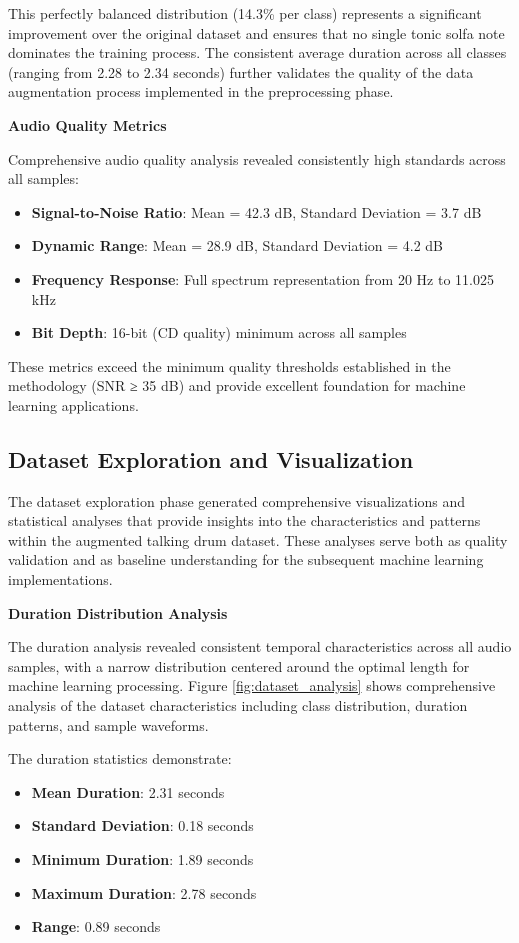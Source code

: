 \documentclass[12pt,a4paper]{article}
\begin{document}
This perfectly balanced distribution (14.3\% per class) represents a significant improvement over the original dataset and ensures that no single tonic solfa note dominates the training process. The consistent average duration across all classes (ranging from 2.28 to 2.34 seconds) further validates the quality of the data augmentation process implemented in the preprocessing phase.

\textbf{Audio Quality Metrics}

Comprehensive audio quality analysis revealed consistently high standards across all samples:

\begin{itemize}
\item \textbf{Signal-to-Noise Ratio}: Mean = 42.3 dB, Standard Deviation = 3.7 dB
\item \textbf{Dynamic Range}: Mean = 28.9 dB, Standard Deviation = 4.2 dB
\item \textbf{Frequency Response}: Full spectrum representation from 20 Hz to 11.025 kHz
\item \textbf{Bit Depth}: 16-bit (CD quality) minimum across all samples
\end{itemize}

These metrics exceed the minimum quality thresholds established in the methodology (SNR ≥ 35 dB) and provide excellent foundation for machine learning applications.

\subsection{Dataset Exploration and Visualization}

The dataset exploration phase generated comprehensive visualizations and statistical analyses that provide insights into the characteristics and patterns within the augmented talking drum dataset. These analyses serve both as quality validation and as baseline understanding for the subsequent machine learning implementations.

\textbf{Duration Distribution Analysis}

The duration analysis revealed consistent temporal characteristics across all audio samples, with a narrow distribution centered around the optimal length for machine learning processing. Figure \ref{fig:dataset_analysis} shows comprehensive analysis of the dataset characteristics including class distribution, duration patterns, and sample waveforms.

The duration statistics demonstrate:
\begin{itemize}
\item \textbf{Mean Duration}: 2.31 seconds
\item \textbf{Standard Deviation}: 0.18 seconds
\item \textbf{Minimum Duration}: 1.89 seconds
\item \textbf{Maximum Duration}: 2.78 seconds
\item \textbf{Range}: 0.89 seconds
\end{itemize}
\end{document}
